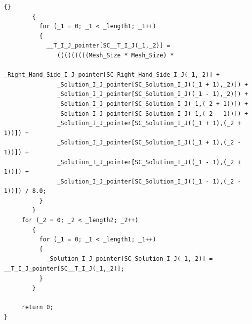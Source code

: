 \documentclass[10pt]{article}
\begin{document}
{\begin{lstlisting}{}
        { 
          for (_1 = 0; _1 < _length1; _1++)
          { 
            __T_I_J_pointer[SC__T_I_J(_1,_2)] = 
               (((((((((Mesh_Size * Mesh_Size) *
               _Right_Hand_Side_I_J_pointer[SC_Right_Hand_Side_I_J(_1,_2)] +
               _Solution_I_J_pointer[SC_Solution_I_J((_1 + 1),_2)]) +
               _Solution_I_J_pointer[SC_Solution_I_J((_1 - 1),_2)]) +
               _Solution_I_J_pointer[SC_Solution_I_J(_1,(_2 + 1))]) +
               _Solution_I_J_pointer[SC_Solution_I_J(_1,(_2 - 1))]) +
               _Solution_I_J_pointer[SC_Solution_I_J((_1 + 1),(_2 + 1))]) +
               _Solution_I_J_pointer[SC_Solution_I_J((_1 + 1),(_2 - 1))]) +
               _Solution_I_J_pointer[SC_Solution_I_J((_1 - 1),(_2 + 1))]) +
               _Solution_I_J_pointer[SC_Solution_I_J((_1 - 1),(_2 - 1))]) / 8.0; 
          }
        } 
     for (_2 = 0; _2 < _length2; _2++)
        { 
          for (_1 = 0; _1 < _length1; _1++)
          { 
            _Solution_I_J_pointer[SC_Solution_I_J(_1,_2)] = __T_I_J_pointer[SC__T_I_J(_1,_2)]; 
          } 
        } 

     return 0;
} 

\end{lstlisting}
}

\end{document}
